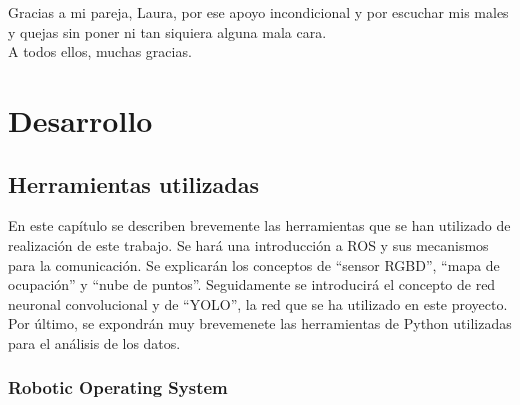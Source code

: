 Gracias a mi pareja, Laura, por ese apoyo incondicional y por escuchar mis males y quejas sin poner ni tan siquiera alguna mala cara.\\

A todos ellos, muchas gracias.\\

\tableofcontents

\cleardoublepage
{} %
\listoffigures %

\cleardoublepage
{} %
\listoftables %



\part{Desarrollo}

\chapter{Herramientas utilizadas}

En este capítulo se describen brevemente las herramientas que se han utilizado de realización de este trabajo. Se hará una introducción a ROS y sus mecanismos para la comunicación. Se explicarán los conceptos de ``sensor RGBD'', ``mapa de ocupación'' y ``nube de puntos''. Seguidamente se introducirá el concepto de red neuronal convolucional y de ``YOLO'', la red que se ha utilizado en este proyecto. Por último, se expondrán muy brevemenete las herramientas de Python utilizadas para el análisis de los datos.\\

\section{Robotic Operating System}

